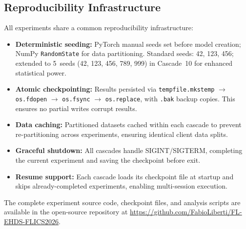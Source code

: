 \documentclass[conference,a4paper]{IEEEtran}
\begin{document}
\subsection{Reproducibility Infrastructure}

All experiments share a common reproducibility infrastructure:

\begin{itemize}
    \item \textbf{Deterministic seeding:} PyTorch manual seeds set before model creation; NumPy \texttt{RandomState} for data partitioning. Standard seeds: 42, 123, 456; extended to 5~seeds (42, 123, 456, 789, 999) in Cascade~10 for enhanced statistical power.
    \item \textbf{Atomic checkpointing:} Results persisted via \texttt{tempfile.mkstemp} $\to$ \texttt{os.fdopen} $\to$ \texttt{os.fsync} $\to$ \texttt{os.replace}, with \texttt{.bak} backup copies. This ensures no partial writes corrupt results.
    \item \textbf{Data caching:} Partitioned datasets cached within each cascade to prevent re-partitioning across experiments, ensuring identical client data splits.
    \item \textbf{Graceful shutdown:} All cascades handle SIGINT/SIGTERM, completing the current experiment and saving the checkpoint before exit.
    \item \textbf{Resume support:} Each cascade loads its checkpoint file at startup and skips already-completed experiments, enabling multi-session execution.
\end{itemize}

\noindent The complete experiment source code, checkpoint files, and analysis scripts are available in the open-source repository at \url{https://github.com/FabioLiberti/FL-EHDS-FLICS2026}.
\end{document}
